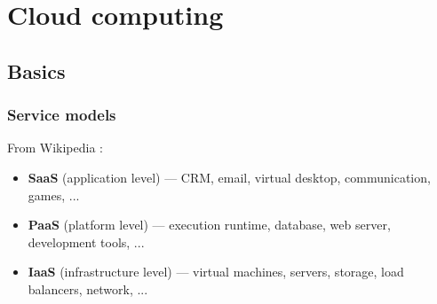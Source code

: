 \section{Cloud computing}

\subsection{Basics}

\subsubsection{Service models}

From Wikipedia \cite{wikipedia_cloud_computing}:
\begin{itemize}
	\item \textbf{SaaS} (application level) --- CRM, email, virtual desktop, communication, games, ...
	\item \textbf{PaaS} (platform level) --- execution runtime, database, web server, development tools, ...
	\item \textbf{IaaS} (infrastructure level) --- virtual machines, servers, storage, load balancers, network, ...
\end{itemize}